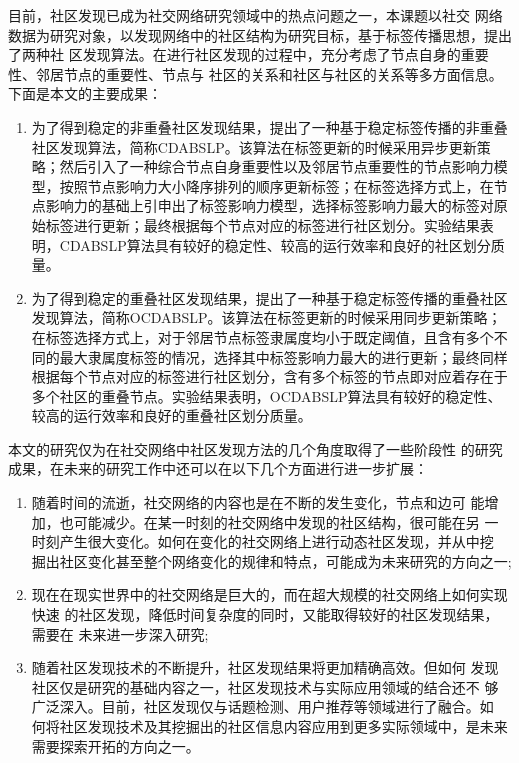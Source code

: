 \begin{conclusion}
目前，社区发现已成为社交网络研究领域中的热点问题之一，本课题以社交
网络数据为研究对象，以发现网络中的社区结构为研究目标，基于标签传播思想，提出了两种社
区发现算法。在进行社区发现的过程中，充分考虑了节点自身的重要性、邻居节点的重要性、节点与
社区的关系和社区与社区的关系等多方面信息。
下面是本文的主要成果：
\begin{enumerate}
    \item 为了得到稳定的非重叠社区发现结果，提出了一种基于稳定标签传播的非重叠社区发现算法，简称CDABSLP。该算法在标签更新的时候采用异步更新策略；然后引入了一种综合节点自身重要性以及邻居节点重要性的节点影响力模型，按照节点影响力大小降序排列的顺序更新标签；在标签选择方式上，在节点影响力的基础上引申出了标签影响力模型，选择标签影响力最大的标签对原始标签进行更新；最终根据每个节点对应的标签进行社区划分。实验结果表明，CDABSLP算法具有较好的稳定性、较高的运行效率和良好的社区划分质量。
    \item 为了得到稳定的重叠社区发现结果，提出了一种基于稳定标签传播的重叠社区发现算法，简称OCDABSLP。该算法在标签更新的时候采用同步更新策略；在标签选择方式上，对于邻居节点标签隶属度均小于既定阈值，且含有多个不同的最大隶属度标签的情况，选择其中标签影响力最大的进行更新；最终同样根据每个节点对应的标签进行社区划分，含有多个标签的节点即对应着存在于多个社区的重叠节点。实验结果表明，OCDABSLP算法具有较好的稳定性、较高的运行效率和良好的重叠社区划分质量。
\end{enumerate}

本文的研究仅为在社交网络中社区发现方法的几个角度取得了一些阶段性
的研究成果，在未来的研究工作中还可以在以下几个方面进行进一步扩展：

\begin{enumerate}
    \item 随着时间的流逝，社交网络的内容也是在不断的发生变化，节点和边可
    能增加，也可能减少。在某一时刻的社交网络中发现的社区结构，很可能在另
    一时刻产生很大变化。如何在变化的社交网络上进行动态社区发现，并从中挖
    掘出社区变化甚至整个网络变化的规律和特点，可能成为未来研究的方向之一;
    \item 现在在现实世界中的社交网络是巨大的，而在超大规模的社交网络上如何实现快速
    的社区发现，降低时间复杂度的同时，又能取得较好的社区发现结果，需要在
    未来进一步深入研究;
    \item 随着社区发现技术的不断提升，社区发现结果将更加精确高效。但如何
    发现社区仅是研究的基础内容之一，社区发现技术与实际应用领域的结合还不
    够广泛深入。目前，社区发现仅与话题检测、用户推荐等领域进行了融合。如
    何将社区发现技术及其挖掘出的社区信息内容应用到更多实际领域中，是未来
    需要探索开拓的方向之一。
\end{enumerate}

\end{conclusion}